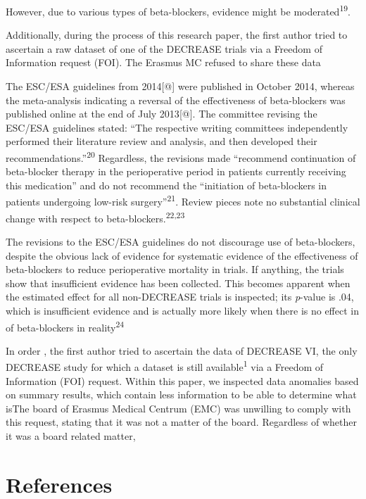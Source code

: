 \documentclass[]{article}
\begin{document}
However, due to various types of beta-blockers, evidence might be
moderated\textsuperscript{19}.

Additionally, during the process of this research paper, the first
author tried to ascertain a raw dataset of one of the DECREASE trials
via a Freedom of Information request (FOI). The Erasmus MC refused to
share these data

The ESC/ESA guidelines from 2014{[}@{]} were published in October 2014,
whereas the meta-analysis indicating a reversal of the effectiveness of
beta-blockers was published online at the end of July 2013{[}@{]}. The
committee revising the ESC/ESA guidelines stated: ``The respective
writing committees independently performed their literature review and
analysis, and then developed their
recommendations.''\textsuperscript{20} Regardless, the revisions made
``recommend continuation of beta-blocker therapy in the perioperative
period in patients currently receiving this medication'' and do not
recommend the ``initiation of beta-blockers in patients undergoing
low-risk surgery''\textsuperscript{21}. Review pieces note no
substantial clinical change with respect to
beta-blockers.\textsuperscript{22,23}

The revisions to the ESC/ESA guidelines do not discourage use of
beta-blockers, despite the obvious lack of evidence for systematic
evidence of the effectiveness of beta-blockers to reduce perioperative
mortality in trials. If anything, the trials show that insufficient
evidence has been collected. This becomes apparent when the estimated
effect for all non-DECREASE trials is inspected; its \emph{p}-value is
.04, which is insufficient evidence and is actually more likely when
there is no effect in of beta-blockers in reality\textsuperscript{24}

In order , the first author tried to ascertain the data of DECREASE VI,
the only DECREASE study for which a dataset is still
available\textsuperscript{1} via a Freedom of Information (FOI) request.
Within this paper, we inspected data anomalies based on summary results,
which contain less information to be able to determine what isThe board
of Erasmus Medical Centrum (EMC) was unwilling to comply with this
request, stating that it was not a matter of the board. Regardless of
whether it was a board related matter,

\section*{References}\label{references}
\end{document}
